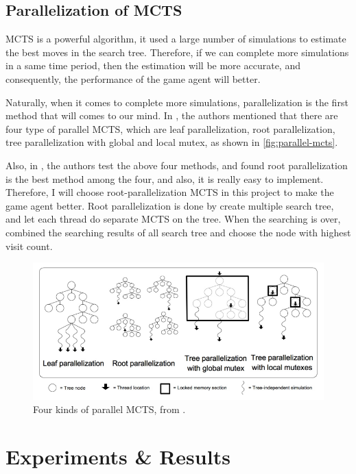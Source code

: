 \documentclass[twocolumn]{extarticle}
\begin{document}
\subsection{Parallelization of MCTS}

MCTS is a powerful algorithm, it used a large number of simulations to estimate the best moves in the search tree. Therefore, if we can complete more simulations in a same time period, then the estimation will be more accurate, and consequently, the performance of the game agent will better.

Naturally, when it comes to complete more simulations, parallelization is the first method that will comes to our mind. 
In \cite{10.1007/978-3-540-87608-3_6}, the authors mentioned that there are four type of parallel MCTS, which are leaf parallelization, root parallelization, tree parallelization with global and local mutex, as shown in \autoref{fig:parallel-mcts}. 

Also, in \cite{5654650}, the authors test the above four methods, and found root parallelization is the best method among the four, and also, it is really easy to implement. Therefore, I will choose root-parallelization MCTS in this project to make the game agent better. Root parallelization is done by create multiple search tree, and let each thread do separate MCTS on the tree. When the searching is over, combined the searching results of all search tree and choose the node with highest visit count.

\begin{figure}[H]
\centering
\includegraphics[width=0.95\linewidth]{img/parallel-mcts}
\caption{Four kinds of parallel MCTS, from \cite{10.1007/978-3-540-87608-3_6}.}
\label{fig:parallel-mcts}
\end{figure}


\section{Experiments \& Results}
\end{document}
